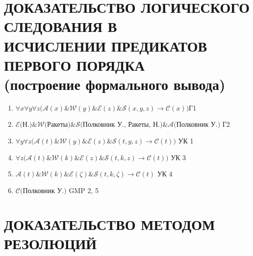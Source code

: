 \documentclass[titlepage,10pt,a4paper]{article}
\begin{document}
\section{ДОКАЗАТЕЛЬСТВО ЛОГИЧЕСКОГО СЛЕДОВАНИЯ В\\ ИСЧИСЛЕНИИ ПРЕДИКАТОВ ПЕРВОГО ПОРЯДКА\\ (построение формального вывода)}
\begin{enumerate}
\item $\forall x\forall y\forall z \bigl( \mathcal{A} \left(x\right) \& \mathcal{W} \left(y\right) \& \mathcal{E} \left(z\right) \& \mathcal{S}\left(x,y,z\right)\rightarrow\mathcal{C}\left(x\right)\bigr)$\hfill Г1
\item $\mathcal{E}\bigl(\text{Н.}\bigr) \& \mathcal{W}\bigl(\text{Ракеты}\bigr) \& \mathcal{S}\bigl(\text{Полковник У., Ракеты, Н.}\bigr) \& \mathcal{A}\bigl(\text{Полковник У.}\bigr)$ \hfill Г2
\item $\forall y\forall z \big( \mathcal{A} \left(t\right) \& \mathcal{W} \left(y\right) \& \mathcal{E} \left(z\right) \& \mathcal{S} \left(t, y, z\right) \rightarrow \mathcal{C} \left(t\right)\bigr)$ \hfill УК 1
\item $\forall z \big( \mathcal{A} \left(t\right) \& \mathcal{W} \left(k\right) \& \mathcal{E} \left(z\right) \& \mathcal{S} \left(t, k, z\right) \rightarrow \mathcal{C} \left(t\right)\bigr)$ \hfill УК 3
\item $\mathcal{A} \left(t\right) \& \mathcal{W} \left(k\right) \& \mathcal{E} \left(\zeta\right) \& \mathcal{S} \left(t, k, \zeta\right) \rightarrow \mathcal{C} \left(t\right)$ \hfill УК 4
\item $\mathcal{C}\bigl(\text{Полковник У.}\bigr)$ \hfill GMP 2, 5
\end{enumerate}

\section{ДОКАЗАТЕЛЬСТВО МЕТОДОМ РЕЗОЛЮЦИЙ}
\end{document}
